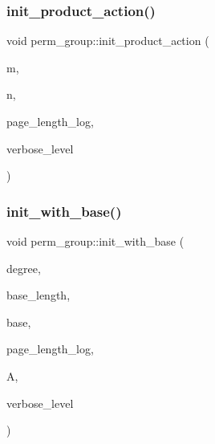 \subsubsection{\texorpdfstring{init\+\_\+product\+\_\+action()}{init\_product\_action()}}
{\footnotesize\ttfamily void perm\+\_\+group\+::init\+\_\+product\+\_\+action (\begin{DoxyParamCaption}\item[{\mbox{\hyperlink{galois_8h_a09fddde158a3a20bd2dcadb609de11dc}{I\+NT}}}]{m,  }\item[{\mbox{\hyperlink{galois_8h_a09fddde158a3a20bd2dcadb609de11dc}{I\+NT}}}]{n,  }\item[{\mbox{\hyperlink{galois_8h_a09fddde158a3a20bd2dcadb609de11dc}{I\+NT}}}]{page\+\_\+length\+\_\+log,  }\item[{\mbox{\hyperlink{galois_8h_a09fddde158a3a20bd2dcadb609de11dc}{I\+NT}}}]{verbose\+\_\+level }\end{DoxyParamCaption})}

\mbox{\label{classperm__group_aa02263e401019788ab97480d11590f9a}} 
\subsubsection{\texorpdfstring{init\+\_\+with\+\_\+base()}{init\_with\_base()}}
{\footnotesize\ttfamily void perm\+\_\+group\+::init\+\_\+with\+\_\+base (\begin{DoxyParamCaption}\item[{\mbox{\hyperlink{galois_8h_a09fddde158a3a20bd2dcadb609de11dc}{I\+NT}}}]{degree,  }\item[{\mbox{\hyperlink{galois_8h_a09fddde158a3a20bd2dcadb609de11dc}{I\+NT}}}]{base\+\_\+length,  }\item[{\mbox{\hyperlink{galois_8h_a09fddde158a3a20bd2dcadb609de11dc}{I\+NT}} $\ast$}]{base,  }\item[{\mbox{\hyperlink{galois_8h_a09fddde158a3a20bd2dcadb609de11dc}{I\+NT}}}]{page\+\_\+length\+\_\+log,  }\item[{\mbox{\hyperlink{classaction}{action}} \&}]{A,  }\item[{\mbox{\hyperlink{galois_8h_a09fddde158a3a20bd2dcadb609de11dc}{I\+NT}}}]{verbose\+\_\+level }\end{DoxyParamCaption})}

